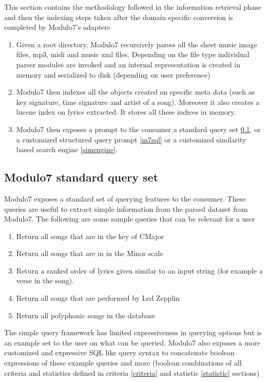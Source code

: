 \noindent This section contains the methodology followed in the information retrieval phase and then the indexing steps taken after the domain specific conversion is completed by Modulo7's adapters

\begin{enumerate}
\item Given a root directory, Modulo7 recursively parses all the sheet music image files, mp3, midi and music xml files. Depending on the file type individual parser modules are invoked and an internal representation is created in memory and serialized to disk (depending on user preference)
\item Modulo7 then indexes all the objects created on specific meta data (such as key signature, time signature and artist of a song). Moreover it also creates a lucene index on lyrics extracted. It stores all these indices in memory. 
\item Modulo7 then exposes a prompt to the consumer a standard query set \ref{standardquery}, or a customized structured query prompt \ref{m7sql} or a customized similarity based search engine \ref{simengine}. 
\end{enumerate}

\subsection{Modulo7 standard query set} \label{standardquery}

\noindent Modulo7 exposes a standard set of querying features to the consumer. These queries are useful to extract simple information from the parsed dataset from Modulo7. The following are some sample queries that can be relevant for a user

\begin{enumerate}
\item Return all songs that are in the key of CMajor
\item Return all songs that are in in the Minor scale
\item Return a ranked order of lyrics given similar to an input string (for example a verse in the song). 
\item Return all songs that are performed by Led Zepplin
\item Return all polyphonic songs in the database
\end{enumerate}

\noindent The simple query framework has limited expressiveness in querying options but is an example set to the user on what can be queried. Modulo7 also exposes a more customized and expressive SQL like query syntax to concatenate boolean expressions of these example queries and more (boolean combinations of all criteria and statistics defined in criteria \ref{criteria} and statistic \ref{statistic} sections)

